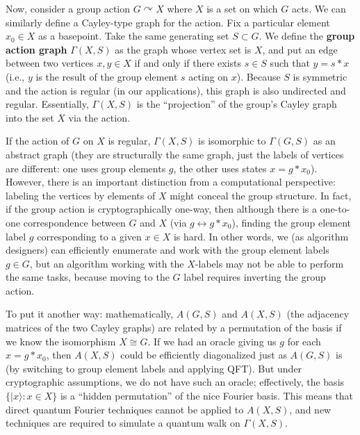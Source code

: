 \documentclass[11pt]{article}
\theoremstyle{definition}
\begin{document}
Now, consider a group action $G \curvearrowright X$ where $X$ is a set on which $G$ acts. We can similarly define a Cayley-type graph for the action. Fix a particular element $x_0 \in X$ as a basepoint. Take the same generating set $S \subset G$. We define the \textbf{group action graph} $\Gamma(X,S)$ as the graph whose vertex set is $X$, and put an edge between two vertices $x, y \in X$ if and only if there exists $s \in S$ such that $y = s * x$ (i.e., $y$ is the result of the group element $s$ acting on $x$). Because $S$ is symmetric and the action is regular (in our applications), this graph is also undirected and regular. Essentially, $\Gamma(X,S)$ is the “projection” of the group’s Cayley graph into the set $X$ via the action.

If the action of $G$ on $X$ is regular, $\Gamma(X,S)$ is isomorphic to $\Gamma(G,S)$ as an abstract graph (they are structurally the same graph, just the labels of vertices are different: one uses group elements $g$, the other uses states $x = g*x_0$). However, there is an important distinction from a computational perspective: labeling the vertices by elements of $X$ might conceal the group structure. In fact, if the group action is cryptographically one-way, then although there is a one-to-one correspondence between $G$ and $X$ (via $g \leftrightarrow g* x_0$), finding the group element label $g$ corresponding to a given $x \in X$ is hard. In other words, we (as algorithm designers) can efficiently enumerate and work with the group element labels $g \in G$, but an algorithm working with the $X$-labels may not be able to perform the same tasks, because moving to the $G$ label requires inverting the group action.

To put it another way: mathematically, $A(G,S)$ and $A(X,S)$ (the adjacency matrices of the two Cayley graphs) are related by a permutation of the basis if we know the isomorphism $X \cong G$. If we had an oracle giving us $g$ for each $x = g*x_0$, then $A(X,S)$ could be efficiently diagonalized just as $A(G,S)$ is (by switching to group element labels and applying QFT). But under cryptographic assumptions, we do not have such an oracle; effectively, the basis $\{|x\rangle: x \in X\}$ is a “hidden permutation” of the nice Fourier basis. This means that direct quantum Fourier techniques cannot be applied to $A(X,S)$, and new techniques are required to simulate a quantum walk on $\Gamma(X,S)$.
\end{document}
